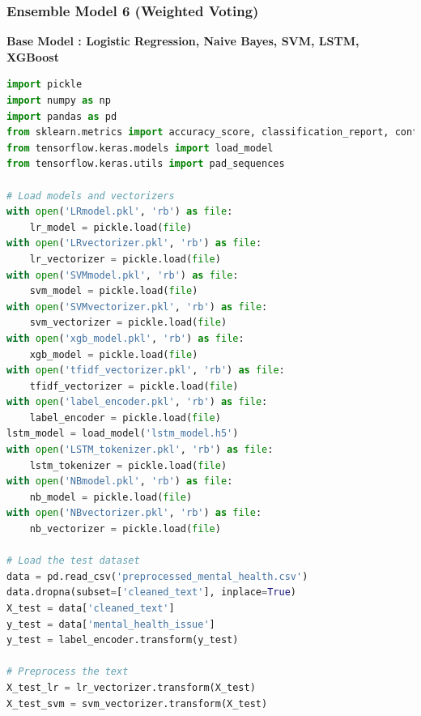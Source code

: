 \pagebreak
\subsubsection{Ensemble Model 6 (Weighted Voting)}

\textbf{Base Model : Logistic Regression, Naive Bayes, SVM, LSTM, XGBoost}

\begin{tcolorbox}[colback=gray!5!white, colframe=gray!80!black, boxrule=0.5pt, title=Weighted Voting Ensemble for Classification]
    \begin{lstlisting}[language=Python]
import pickle
import numpy as np
import pandas as pd
from sklearn.metrics import accuracy_score, classification_report, confusion_matrix
from tensorflow.keras.models import load_model
from tensorflow.keras.utils import pad_sequences

# Load models and vectorizers
with open('LRmodel.pkl', 'rb') as file:
    lr_model = pickle.load(file)
with open('LRvectorizer.pkl', 'rb') as file:
    lr_vectorizer = pickle.load(file)
with open('SVMmodel.pkl', 'rb') as file:
    svm_model = pickle.load(file)
with open('SVMvectorizer.pkl', 'rb') as file:
    svm_vectorizer = pickle.load(file)
with open('xgb_model.pkl', 'rb') as file:
    xgb_model = pickle.load(file)
with open('tfidf_vectorizer.pkl', 'rb') as file:
    tfidf_vectorizer = pickle.load(file)
with open('label_encoder.pkl', 'rb') as file:
    label_encoder = pickle.load(file)
lstm_model = load_model('lstm_model.h5')
with open('LSTM_tokenizer.pkl', 'rb') as file:
    lstm_tokenizer = pickle.load(file)
with open('NBmodel.pkl', 'rb') as file:
    nb_model = pickle.load(file)
with open('NBvectorizer.pkl', 'rb') as file:
    nb_vectorizer = pickle.load(file)

# Load the test dataset
data = pd.read_csv('preprocessed_mental_health.csv')
data.dropna(subset=['cleaned_text'], inplace=True)
X_test = data['cleaned_text']
y_test = data['mental_health_issue']
y_test = label_encoder.transform(y_test)

# Preprocess the text
X_test_lr = lr_vectorizer.transform(X_test)
X_test_svm = svm_vectorizer.transform(X_test)
\end{lstlisting}
\end{tcolorbox}
